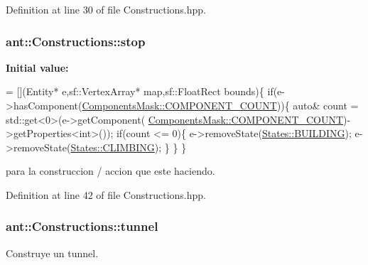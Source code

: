 Definition at line 30 of file Constructions.\+hpp.

\hypertarget{classant_1_1_constructions_a3bc1283137ad6344af1f966256bdfe89}{
\subsubsection[{stop}]{ ant\+::\+Constructions\+::stop\hspace{0.3cm}{\ttfamily [static]}}}\label{classant_1_1_constructions_a3bc1283137ad6344af1f966256bdfe89}
{\bfseries Initial value\+:}
\begin{DoxyCode}
= [](Entity* e,sf::VertexArray* map,sf::FloatRect bounds)\{
        \textcolor{keywordflow}{if}(e->hasComponent(\hyperlink{class_components_mask_a7a90217e6d5da07c838e12fe2f355448}{ComponentsMask::COMPONENT\_COUNT}))\{
            \textcolor{keyword}{auto}& count = std::get<0>(e->getComponent(
      \hyperlink{class_components_mask_a7a90217e6d5da07c838e12fe2f355448}{ComponentsMask::COMPONENT\_COUNT})->getProperties<\textcolor{keywordtype}{int}>());
            \textcolor{keywordflow}{if}(count <= 0)\{
                e->removeState(\hyperlink{class_states_a1a05b30c6f6c881b703c40f217890ac2}{States::BUILDING});
                e->removeState(\hyperlink{class_states_a1a5a36f0f204d9dda0ebd0a09b6fd7fe}{States::CLIMBING});
            \}
        \}
    \}
\end{DoxyCode}


para la construccion / accion que este haciendo. 



Definition at line 42 of file Constructions.\+hpp.

\hypertarget{classant_1_1_constructions_a840caf607a2a82b46ec083ce00fc55bc}{
\subsubsection[{tunnel}]{ ant\+::\+Constructions\+::tunnel\hspace{0.3cm}{\ttfamily [static]}}}\label{classant_1_1_constructions_a840caf607a2a82b46ec083ce00fc55bc}


Construye un tunnel. 



